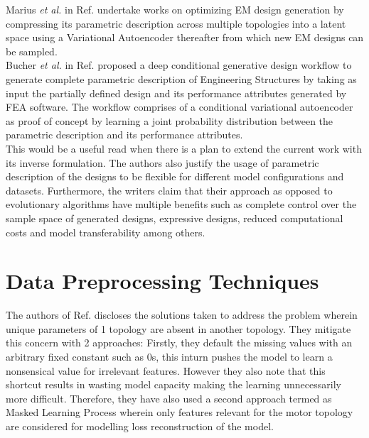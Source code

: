 \documentclass{report} %
\begin{document}
Marius \textit{et al.} in Ref. \cite{VAE-MT-2024} undertake works on optimizing \ac{EM} design generation by compressing its parametric description 
across multiple topologies into a latent space using a Variational Autoencoder thereafter from which new \ac{EM} designs can be sampled.\\
Bucher \textit{et al.} in Ref. \cite{GDEM-2023} proposed a deep conditional generative design workflow to generate complete parametric 
description of Engineering Structures by taking as input the partially defined design and its performance attributes generated by \ac{FEA} software. 
The workflow comprises of a conditional variational autoencoder as proof of concept by learning a joint probability distribution between the parametric description and 
its performance attributes. \\
This would be a useful read when there is a plan to extend the current work with its inverse formulation. 
The authors also justify the usage of parametric description of the designs to be flexible for different model configurations and datasets. 
Furthermore, the writers claim that their approach as opposed to evolutionary algorithms have multiple benefits such as complete control over 
the sample space of generated designs, expressive designs, reduced computational costs and model transferability among others.

\section{Data Preprocessing Techniques}\label{sec:LR Data Preprocessing Techniques}
The authors of Ref. \cite{VAE-MT-2024} discloses the solutions taken to address the problem wherein unique parameters of 1 topology are absent in another topology.
They mitigate this concern with 2 approaches: Firstly, they default the missing values with an arbitrary fixed constant such as 0s, this inturn pushes the model to learn a 
nonsensical value for irrelevant features. However they also note that this shortcut results in wasting model capacity making the learning unnecessarily more difficult.
Therefore, they have also used a second approach termed as Masked Learning Process wherein only features relevant for the motor topology are 
considered for modelling loss reconstruction of the model.
\end{document}
